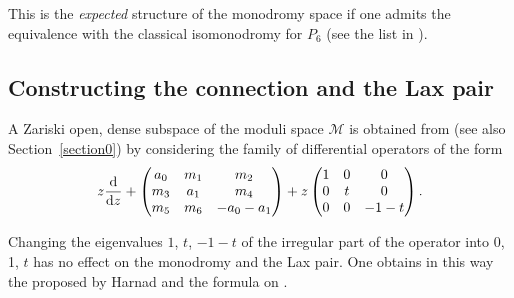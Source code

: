 \documentclass[10pt,a4paper]{amsart}
\numberwithin{equation}{section}
\begin{document}
 This is the {\it expected} structure of the monodromy space if one admits the equivalence with the classical
 isomonodromy for $P_6$ (see the list in \cite[Section~2.2]{vdP-Sa}).

\subsection{Constructing the connection and the Lax pair}

 A Zariski open, dense subspace of the moduli space $\mathcal{M}$ is obtained from \cite[Theorem 12.4]{vdP-Si} (see also Section~\ref{section0}) by considering the family of differential operators of the form
 \[ z\frac{{\rm d}}{{\rm d}z}+\begin{pmatrix}a_0 &m_1 &m_2 \\m_3 &a_1 &m_4 \\ m_5 &m_6 &-a_0-a_1 \end{pmatrix}
 +z\begin{pmatrix}1 &0 &0 \\ 0& t& 0\\ 0& 0&-1-t \end{pmatrix}.\]

Changing the eigenvalues $1$, $t$, $-1-t$ of the irregular part of the operator into 0, 1, $t$ has no effect on the
monodromy and the Lax pair. One obtains in this way the \cite[formula (3.62)]{H} proposed by Harnad and the formula on \cite[p.\ 3]{Maz}.
\end{document}
